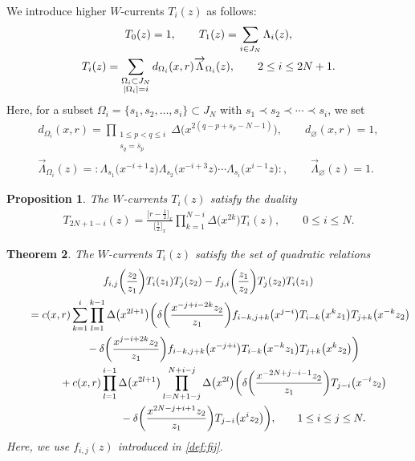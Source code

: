 \documentclass[pdftex]{sigma}
\numberwithin{equation}{section}
\newtheorem{Theorem}{Theorem}[section]
\newtheorem{Proposition}[Theorem]{Proposition}
\begin{document}
We introduce higher $W$-currents $T_i(z)$ as follows:
\begin{gather}
T_0(z)=1,\qquad
T_1(z)=\sum_{i \in J_N}\Lambda_i(z),\notag
\\
T_i(z)=\sum\limits_{\substack{\Omega_i \subset J_N\\|\Omega_i|=i}}
d_{\Omega_i}(x,r) \overrightarrow{\Lambda}_{\Omega_i}(z),\qquad
2 \leq i \leq 2N+1.
\label{def:Ti(z)}
\end{gather}
Here, for a subset $\Omega_i=\{s_1, s_2, \dots, s_i\}
\subset J_N$ with $s_1\prec s_2 \prec \cdots \prec s_i$, we set
\begin{gather*}
d_{\Omega_i}(x,r)=
\prod\limits_{\substack{1\leq p<q \leq i \\s_q=\overline{s}_p}}\Delta\big(x^{2(q-p+s_p-N-1)}\big),\qquad
d_{\varnothing}(x,r)=1,
\\
\overrightarrow{\Lambda}_{\Omega_i}(z)={:}\Lambda_{s_1}\big(x^{-i+1}z\big)\Lambda_{s_2}\big(x^{-i+3}z\big)
\cdots \Lambda_{s_i}\big(x^{i-1}z\big){:},\qquad
\overrightarrow{\Lambda}_{\varnothing}(z)=1.
\end{gather*}

\begin{Proposition}
\label{prop:3-1}
The $W$-currents $T_i(z)$ satisfy the duality
\begin{gather}
T_{2N+1-i}(z)=\frac{\big[r-\frac{1}{2}\big]_x}{\big[\frac{1}{2}\big]_x}\prod_{k=1}^{N-i}
\Delta\big(x^{2k}\big)T_i(z),\qquad
0\leq i \leq N.
\label{prop:duality}
\end{gather}
\end{Proposition}

\begin{Theorem}\label{thm:3-2}
The $W$-currents $T_i(z)$ satisfy the set of quadratic relations
\begin{gather}
f_{i,j}\bigg(\frac{z_2}{z_1}\bigg)T_i(z_1)T_j(z_2)-
f_{j,i}\bigg(\frac{z_1}{z_2}\bigg)T_j(z_2)T_i(z_1)\notag
\\ \qquad
{}=c(x,r)\sum_{k=1}^i \prod_{l=1}^{k-1}\Delta\big(x^{2l+1}\big)
\bigg(\delta\bigg(\frac{x^{-j+i-2k}z_2}{z_1}\bigg)
f_{i-k, j+k}\big(x^{j-i}\big)T_{i-k}\big(x^{k}z_1\big)T_{j+k}\big(x^{-k}z_2\big)\notag
\\ \qquad\hphantom{=}
{}-\delta\bigg(\frac{x^{j-i+2k}z_2}{z_1}\bigg)
f_{i-k, j+k}\big(x^{-j+i}\big)T_{i-k}\big(x^{-k}z_1\big)T_{j+k}\big(x^kz_2\big)\bigg)\notag
\\ \qquad\hphantom{=}
{}+ c(x,r)\prod_{l=1}^{i-1}\Delta\big(x^{2l+1}\big)
\prod_{l=N+1-j}^{N+i-j}\Delta\big(x^{2l}\big)\notag
\bigg(\delta\bigg(\frac{x^{-2N+j-i-1}z_2}{z_1}\bigg)T_{j-i}\big(x^{-i}z_2\big)
\\ \qquad\hphantom{=+ c(x,r)}
{}-\delta\bigg(\frac{x^{2N-j+i+1}z_2}{z_1}\bigg)T_{j-i}\big(x^{i}z_2\big)\bigg),\qquad
1\leq i \leq j \leq N
\label{thm:quadratic}.
\end{gather}
Here, we use $f_{i,j}(z)$ {introduced} in \eqref{def:fij}.
\end{Theorem}
\end{document}
